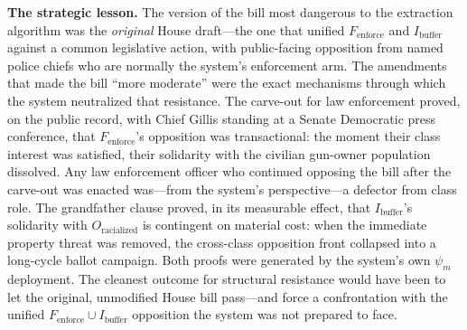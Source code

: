 \begin{keyinsight}
\textbf{The strategic lesson.} The version of the bill most dangerous to the extraction algorithm was the \textit{original} House draft---the one that unified $F_{\text{enforce}}$ and $I_{\text{buffer}}$ against a common legislative action, with public-facing opposition from named police chiefs who are normally the system's enforcement arm. The amendments that made the bill ``more moderate'' were the exact mechanisms through which the system neutralized that resistance. The carve-out for law enforcement proved, on the public record, with Chief Gillis standing at a Senate Democratic press conference, that $F_{\text{enforce}}$'s opposition was transactional: the moment their class interest was satisfied, their solidarity with the civilian gun-owner population dissolved. Any law enforcement officer who continued opposing the bill after the carve-out was enacted was---from the system's perspective---a defector from class role. The grandfather clause proved, in its measurable effect, that $I_{\text{buffer}}$'s solidarity with $O_{\text{racialized}}$ is contingent on material cost: when the immediate property threat was removed, the cross-class opposition front collapsed into a long-cycle ballot campaign. Both proofs were generated by the system's own $\psi_m$ deployment. The cleanest outcome for structural resistance would have been to let the original, unmodified House bill pass---and force a confrontation with the unified $F_{\text{enforce}} \cup I_{\text{buffer}}$ opposition the system was not prepared to face.
\end{keyinsight}

